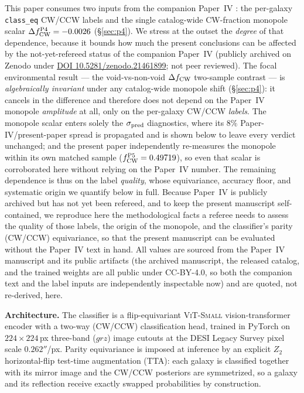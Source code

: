 \documentclass[twocolumn,linenumbers]{aastex702}
\newcommand{\paperIVarxiv}{publicly archived on Zenodo under
\href{https://doi.org/10.5281/zenodo.21461899}{DOI 10.5281/zenodo.21461899};
not peer reviewed}
\begin{document}
This paper consumes two inputs from the companion Paper~IV
\cite{golden_chirality_2026}: the per-galaxy \texttt{class\_eq} CW/CCW
labels and the single catalog-wide CW-fraction monopole scalar
$\Delta f_{\rm CW}^{\rm P4}=-0.0026$ (\S\ref{sec:p4}). We stress at the
outset the \emph{degree} of that dependence, because it bounds how much
the present conclusions can be affected by the not-yet-refereed status of
the companion Paper~IV (\paperIVarxiv). The focal environmental result --- the void-vs-non-void
$\Delta f_{\rm CW}$ two-sample contrast --- is \emph{algebraically
invariant} under any catalog-wide monopole shift (\S\ref{sec:p4}): it
cancels in the difference and therefore does not depend on the Paper~IV
monopole \emph{amplitude} at all, only on the per-galaxy CW/CCW
\emph{labels}. The monopole scalar enters solely the $\sigma_{\rm pred}$
diagnostics, where its $8\%$ Paper-IV/present-paper spread is propagated
and is shown below to leave every verdict unchanged; and the present
paper independently re-measures the monopole within its own matched
sample ($f_{\rm CW}^{\rm P5}=0.49719$), so even that scalar is
corroborated here without relying on the Paper~IV number. The remaining
dependence is thus on the label \emph{quality}, whose equivariance,
accuracy floor, and systematic origin we quantify below in full.
Because Paper~IV is publicly archived but has not yet been refereed, and to
keep the present manuscript self-contained, we reproduce here the
methodological facts a referee needs to assess the quality of those
labels, the origin of the monopole, and the classifier's parity
(CW/CCW) equivariance, so that the present manuscript can be evaluated
without the Paper~IV text in hand. All values are sourced from the
Paper~IV manuscript and its public artifacts (the archived manuscript, the
released catalog, and the trained weights are all public under CC-BY-4.0, so
both the companion text and the label inputs are independently inspectable
now) and are quoted, not re-derived, here.

\textbf{Architecture.} The classifier is a flip-equivariant
\textsc{ViT-Small} vision-transformer encoder with a two-way
(CW/CCW) classification head, trained in PyTorch on
$224\times224$\,px three-band ($grz$) image cutouts at the
DESI Legacy Survey pixel scale $0.262''$/px. Parity equivariance is
imposed at inference by an explicit $Z_2$ horizontal-flip
test-time augmentation (TTA): each galaxy is classified together with
its mirror image and the CW/CCW posteriors are symmetrized, so a galaxy
and its reflection receive exactly swapped probabilities by
construction.
\end{document}
